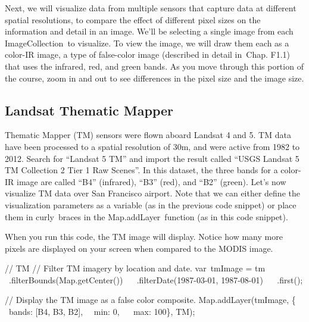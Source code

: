 \documentclass[
  letterpaper,
  DIV=11,
  numbers=noendperiod]{scrreprt}
\newenvironment{Shaded}{\begin{snugshade}}{\end{snugshade}}
\newcommand{\AttributeTok}[1]{\textcolor[rgb]{0.40,0.45,0.13}{#1}}
\newcommand{\BuiltInTok}[1]{\textcolor[rgb]{0.00,0.23,0.31}{#1}}
\newcommand{\CommentTok}[1]{\textcolor[rgb]{0.37,0.37,0.37}{#1}}
\newcommand{\DataTypeTok}[1]{\textcolor[rgb]{0.68,0.00,0.00}{#1}}
\newcommand{\DecValTok}[1]{\textcolor[rgb]{0.68,0.00,0.00}{#1}}
\newcommand{\FunctionTok}[1]{\textcolor[rgb]{0.28,0.35,0.67}{#1}}
\newcommand{\NormalTok}[1]{\textcolor[rgb]{0.00,0.23,0.31}{#1}}
\newcommand{\OperatorTok}[1]{\textcolor[rgb]{0.37,0.37,0.37}{#1}}
\newcommand{\StringTok}[1]{\textcolor[rgb]{0.13,0.47,0.30}{#1}}
\begin{document}
Next, we will visualize data from multiple sensors that capture data at
different spatial resolutions, to compare the effect of different pixel
sizes on the information and detail in an image. We'll be selecting a
single image from each ImageCollection~to visualize. To view the image,
we will draw them each as a color-IR image, a type of false-color image
(described in detail in~Chap. F1.1) that uses the infrared, red, and
green bands. As you move through this portion of the course, zoom in and
out to see differences in the pixel size and the image size.

\hypertarget{landsat-thematic-mapper}{%
\subsection{Landsat Thematic Mapper}\label{landsat-thematic-mapper}}

Thematic Mapper (TM) sensors were flown aboard Landsat 4 and 5. TM data
have been processed to a spatial resolution of 30m, and were active from
1982 to 2012. Search for ``Landsat 5 TM'' and import the result called
``USGS Landsat 5 TM Collection 2 Tier 1 Raw Scenes''. In this dataset,
the three bands for a color-IR image are called ``B4'' (infrared),
``B3'' (red), and ``B2'' (green). Let's now visualize TM data over San
Francisco airport. Note that we can either define the visualization
parameters as a variable (as in the previous code snippet) or place them
in curly~braces in the Map.addLayer~function (as in this code snippet).

When you run this code, the TM image will display. Notice how many more
pixels are displayed on your screen when compared to the MODIS image.

\begin{Shaded}
\begin{Highlighting}[]
\CommentTok{// TM  }
\CommentTok{// Filter TM imagery by location and date.  }
\NormalTok{var tmImage }\OperatorTok{=}\NormalTok{ tm  }\AttributeTok{ }\OperatorTok{.}\FunctionTok{filterBounds}\NormalTok{(}\BuiltInTok{Map}\OperatorTok{.}\FunctionTok{getCenter}\NormalTok{())  }
  \AttributeTok{ }\OperatorTok{.}\FunctionTok{filterDate}\NormalTok{(}\StringTok{\textquotesingle{}1987{-}03{-}01\textquotesingle{}}\OperatorTok{,} \StringTok{\textquotesingle{}1987{-}08{-}01\textquotesingle{}}\NormalTok{)  }
  \AttributeTok{ }\OperatorTok{.}\FunctionTok{first}\NormalTok{()}\OperatorTok{;}  
  
\CommentTok{// Display the TM image as a false color composite.  }
\BuiltInTok{Map}\OperatorTok{.}\FunctionTok{addLayer}\NormalTok{(tmImage}\OperatorTok{,}\NormalTok{ \{  }
  \DataTypeTok{ bands}\OperatorTok{:}\NormalTok{ [}\StringTok{\textquotesingle{}B4\textquotesingle{}}\OperatorTok{,} \StringTok{\textquotesingle{}B3\textquotesingle{}}\OperatorTok{,} \StringTok{\textquotesingle{}B2\textquotesingle{}}\NormalTok{]}\OperatorTok{,}  \DataTypeTok{ min}\OperatorTok{:} \DecValTok{0}\OperatorTok{,}  
  \DataTypeTok{ max}\OperatorTok{:} \DecValTok{100}\NormalTok{\}}\OperatorTok{,} \StringTok{\textquotesingle{}TM\textquotesingle{}}\NormalTok{)}\OperatorTok{;}
\end{Highlighting}
\end{Shaded}
\end{document}

